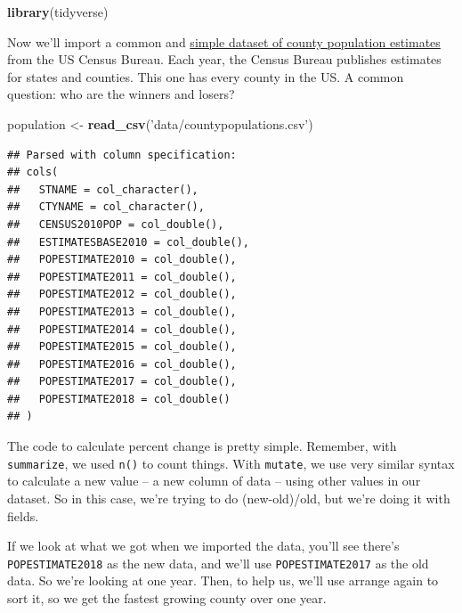 \documentclass[]{book}
\newenvironment{Shaded}{\begin{snugshade}}{\end{snugshade}}
\newcommand{\DataTypeTok}[1]{\textcolor[rgb]{0.13,0.29,0.53}{#1}}
\newcommand{\KeywordTok}[1]{\textcolor[rgb]{0.13,0.29,0.53}{\textbf{#1}}}
\newcommand{\NormalTok}[1]{#1}
\newcommand{\OperatorTok}[1]{\textcolor[rgb]{0.81,0.36,0.00}{\textbf{#1}}}
\newcommand{\StringTok}[1]{\textcolor[rgb]{0.31,0.60,0.02}{#1}}
\begin{document}
\begin{Shaded}
\begin{Highlighting}[]
\KeywordTok{library}\NormalTok{(tidyverse)}
\end{Highlighting}
\end{Shaded}

Now we'll import a common and \href{https://unl.box.com/s/ad8zrib123psjxjjhd8t5m2fgfdfv3q3}{simple dataset of county population estimates} from the US Census Bureau. Each year, the Census Bureau publishes estimates for states and counties. This one has every county in the US. A common question: who are the winners and losers?

\begin{Shaded}
\begin{Highlighting}[]
\NormalTok{population <-}\StringTok{ }\KeywordTok{read_csv}\NormalTok{(}\StringTok{'data/countypopulations.csv'}\NormalTok{)}
\end{Highlighting}
\end{Shaded}

\begin{verbatim}
## Parsed with column specification:
## cols(
##   STNAME = col_character(),
##   CTYNAME = col_character(),
##   CENSUS2010POP = col_double(),
##   ESTIMATESBASE2010 = col_double(),
##   POPESTIMATE2010 = col_double(),
##   POPESTIMATE2011 = col_double(),
##   POPESTIMATE2012 = col_double(),
##   POPESTIMATE2013 = col_double(),
##   POPESTIMATE2014 = col_double(),
##   POPESTIMATE2015 = col_double(),
##   POPESTIMATE2016 = col_double(),
##   POPESTIMATE2017 = col_double(),
##   POPESTIMATE2018 = col_double()
## )
\end{verbatim}

The code to calculate percent change is pretty simple. Remember, with \texttt{summarize}, we used \texttt{n()} to count things. With \texttt{mutate}, we use very similar syntax to calculate a new value -- a new column of data -- using other values in our dataset. So in this case, we're trying to do (new-old)/old, but we're doing it with fields.

If we look at what we got when we imported the data, you'll see there's \texttt{POPESTIMATE2018} as the new data, and we'll use \texttt{POPESTIMATE2017} as the old data. So we're looking at one year. Then, to help us, we'll use arrange again to sort it, so we get the fastest growing county over one year.

\begin{Shaded}
\end{Shaded}
\end{document}
